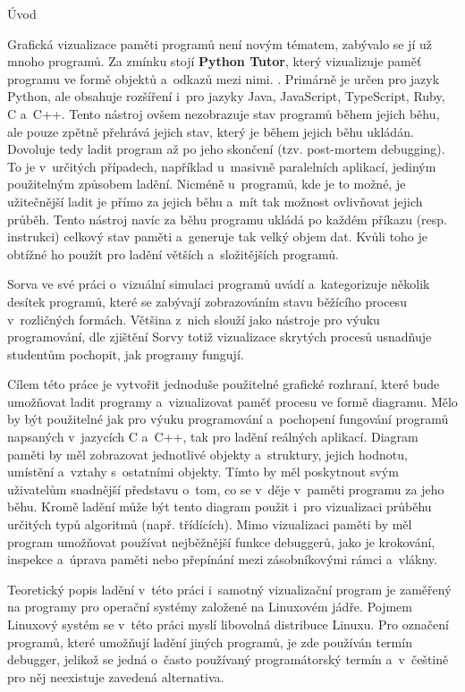 \documentclass[czech,bachelor,male,python,dept460,hidelinks]{diploma}						%
\newcommand{\parspace}[1][]{
	\ifthenelse{\isempty{#1}}{\vspace{0mm}}{\vspace{#1}}
	\par
}
\begin{document}
\begin{section}{Úvod}
	\parspace Grafická vizualizace paměti programů není novým tématem, zabývalo se jí už mnoho programů. Za zmínku stojí \textbf{Python Tutor}, který vizualizuje
	paměť programu ve formě objektů a~odkazů mezi nimi. \cite{GuoSIGCSE2013}.
	Primárně je určen pro jazyk Python, ale obsahuje rozšíření i~pro jazyky Java, JavaScript, TypeScript, Ruby, C a~C++.
	Tento nástroj ovšem nezobrazuje stav programů během jejich běhu, ale pouze zpětně přehrává jejich stav, který je během jejich běhu ukládán.
	Dovoluje tedy ladit program až po jeho skončení (tzv. post-mortem debugging). To je v~určitých případech, například u~masivně
	paralelních aplikací, jediným použitelným způsobem ladění. Nicméně u~programů, kde je to možné, je užitečnější ladit je přímo za jejich běhu a~mít
	tak možnost ovlivňovat jejich průběh. Tento nástroj navíc za běhu programu ukládá po každém příkazu (resp. instrukci) celkový stav paměti
	a~generuje tak velký objem dat. Kvůli toho je obtížné ho použít pro ladění větších a~složitějších programů.
	
	\parspace Sorva ve své práci o~vizuální simulaci programů \cite[140]{sorva2012visual} uvádí a~kategorizuje několik desítek programů,
	které se zabývají zobrazováním stavu běžícího procesu v~rozličných formách. Většina z~nich slouží jako nástroje pro výuku programování,
	dle zjištění Sorvy totiž vizualizace skrytých procesů usnadňuje studentům pochopit, jak programy fungují. \cite[212]{sorva2012visual}
	
	\parspace Cílem této práce je vytvořit jednoduše použitelné grafické rozhraní, které bude umožňovat ladit programy a~vizualizovat paměť procesu
	ve formě diagramu. Mělo by být použitelné jak pro výuku programování a~pochopení fungování programů napsaných v~jazycích C a~C++, tak pro ladění reálných
	aplikací. Diagram paměti by měl zobrazovat jednotlivé objekty a~struktury, jejich hodnotu, umístění a~vztahy s~ostatními objekty.
	Tímto by měl poskytnout svým uživatelům snadnější představu o~tom, co se v~děje v~paměti programu za jeho běhu.
	Kromě ladění může být tento diagram použit i~pro vizualizaci průběhu určitých typů algoritmů (např. třídících). Mimo vizualizaci paměti by měl program
	umožňovat používat nejběžnější funkce debuggerů, jako je krokování, inspekce a~úprava paměti nebo přepínání mezi zásobníkovými rámci a~vlákny.
	
	\parspace Teoretický popis ladění v~této práci i~samotný vizualizační program je zaměřený na programy pro operační systémy založené na Linuxovém jádře.
	Pojmem Linuxový systém se v~této práci myslí libovolná distribuce Linuxu. Pro označení programů, které umožňují ladění jiných programů,
	je zde používán termín debugger, jelikož se jedná o~často používaný programátorský termín a~v~češtině pro něj neexistuje zavedená alternativa.


\end{section}
\end{document}

